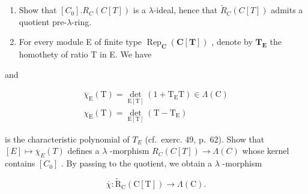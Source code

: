 \begin{enumerate}
\def\labelenumi{\alph{enumi})}
\item
  Show that \([C_{0}].R_{C}(C[T])\) is a \(\lambda\)-ideal, hence that \(\tilde{R}_{C}(C[T])\) admits a quotient pre-\(\lambda\)-ring.
\item
  For every module E of finite type \(\operatorname{Rep}_{\mathbf{C}}(\mathbf{C}[\mathbf{T}])\) , denote by \(\mathbf{T}_{\mathbf{E}}\) the homothety of ratio T in E. We have
\end{enumerate}

and

\[
\begin{array}{l} \overline {{\chi}} _ {\mathrm{E}} (\mathrm{T}) = \det _ {\mathrm{E} [ \mathrm{T} ]} (1 + \mathrm{T} _ {\mathrm{E}} \mathrm{T}) \in \Lambda (\mathrm{C}) \\ \chi_ {\mathrm{E}} (\mathrm{T}) = \det _ {\mathrm{E} [ \mathrm{T} ]} (\mathrm{T} - \mathrm{T} _ {\mathrm{E}}) \end{array}
\]

is the characteristic polynomial of \(T_{E}\) (cf.~exerc. 49, p.~62). Show that \([E] \mapsto \overline{\chi}_{E}(T)\) defines a \(\lambda\) -morphism \(R_{C}(C[T]) \to \Lambda(C)\) whose kernel contains \([C_{0}]\) . By passing to the quotient, we obtain a \(\lambda\) -morphism

\[
\overline {{\chi}}: \tilde {\mathrm{R}} _ {\mathrm{C}} (\mathrm{C} [ \mathrm{T} ]) \to \Lambda (\mathrm{C}).
\]

